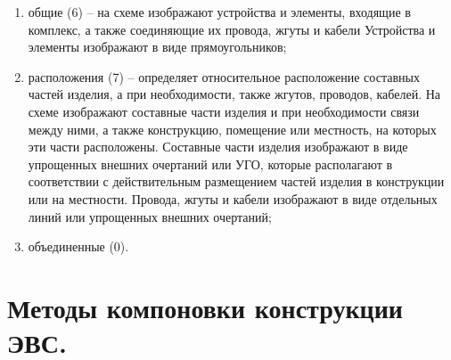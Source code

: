 \documentclass[unicode, 12pt, a4paper, oneside]{article}
\begin{document}
\begin{enumerate}
\item общие (6) – на схеме изображают устройства и элементы, входящие в комплекс, а также соединяющие их провода, жгуты и кабели Устройства и элементы изображают в виде прямоугольников;
\item расположения (7) – определяет относительное расположение составных частей изделия, а при необходимости, также жгутов, проводов, кабелей. На схеме изображают составные части изделия и при необходимости связи между ними, а также конструкцию, помещение или местность, на которых эти части расположены. Составные части изделия изображают в виде упрощенных внешних очертаний или УГО, которые располагают в соответствии с действительным размещением частей изделия в конструкции или на местности. Провода, жгуты и кабели изображают в виде отдельных линий или упрощенных внешних очертаний;
\item объединенные (0).
\end{enumerate}


\section{Методы компоновки конструкции ЭВС.}
\end{document}
